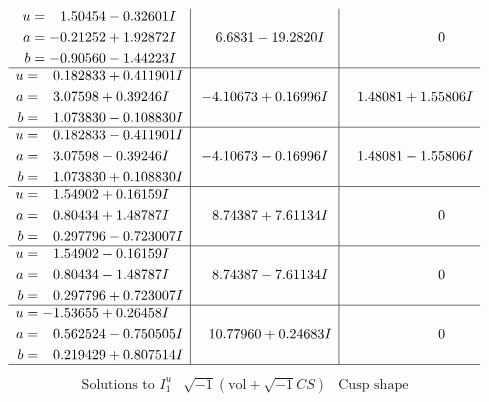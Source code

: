 \documentclass[1p]{elsarticle_modified}
\theoremstyle{definition}
\newcommand{\I}{\sqrt{-1}}
\begin{document}
$$\begin{array}{c|c|c}
\begin{aligned}
u &= \phantom{-}1.50454 - 0.32601 I \\
a &= -0.21252 + 1.92872 I \\
b &= -0.90560 - 1.44223 I\end{aligned}
 & \phantom{-}6.6831 - 19.2820 I & \phantom{-0.000000 } 0 \\ \hline\begin{aligned}
u &= \phantom{-}0.182833 + 0.411901 I \\
a &= \phantom{-}3.07598 + 0.39246 I \\
b &= \phantom{-}1.073830 - 0.108830 I\end{aligned}
 & -4.10673 + 0.16996 I & \phantom{-}1.48081 + 1.55806 I \\ \hline\begin{aligned}
u &= \phantom{-}0.182833 - 0.411901 I \\
a &= \phantom{-}3.07598 - 0.39246 I \\
b &= \phantom{-}1.073830 + 0.108830 I\end{aligned}
 & -4.10673 - 0.16996 I & \phantom{-}1.48081 - 1.55806 I \\ \hline\begin{aligned}
u &= \phantom{-}1.54902 + 0.16159 I \\
a &= \phantom{-}0.80434 + 1.48787 I \\
b &= \phantom{-}0.297796 - 0.723007 I\end{aligned}
 & \phantom{-}8.74387 + 7.61134 I & \phantom{-0.000000 } 0 \\ \hline\begin{aligned}
u &= \phantom{-}1.54902 - 0.16159 I \\
a &= \phantom{-}0.80434 - 1.48787 I \\
b &= \phantom{-}0.297796 + 0.723007 I\end{aligned}
 & \phantom{-}8.74387 - 7.61134 I & \phantom{-0.000000 } 0 \\ \hline\begin{aligned}
u &= -1.53655 + 0.26458 I \\
a &= \phantom{-}0.562524 - 0.750505 I \\
b &= \phantom{-}0.219429 + 0.807514 I\end{aligned}
 & \phantom{-}10.77960 + 0.24683 I & \phantom{-0.000000 } 0\\
 \hline 
 \end{array}$$\newpage$$\begin{array}{c|c|c}  
\text{Solutions to }I^u_{1}& \I (\text{vol} + \sqrt{-1}CS) & \text{Cusp shape}\\

\end{array}$$
\end{document}
